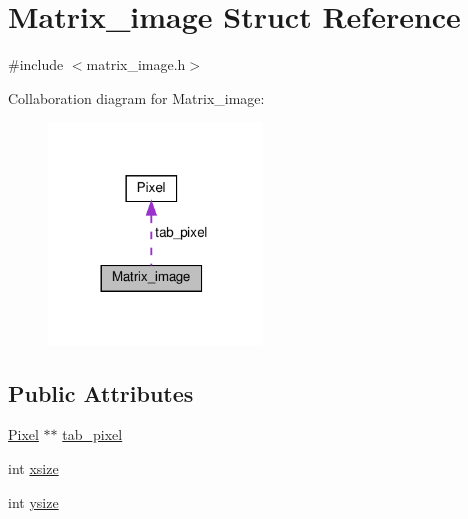 \hypertarget{struct_matrix__image}{}\section{Matrix\+\_\+image Struct Reference}
\label{struct_matrix__image}


{\ttfamily \#include $<$matrix\+\_\+image.\+h$>$}



Collaboration diagram for Matrix\+\_\+image\+:\nopagebreak
\begin{figure}[H]
\begin{center}
\leavevmode
\includegraphics[width=161pt]{struct_matrix__image__coll__graph}
\end{center}
\end{figure}
\subsection*{Public Attributes}
\begin{DoxyCompactItemize}
\item 
\hyperlink{class_pixel}{Pixel} $\ast$$\ast$ \hyperlink{struct_matrix__image_a9276f0a4813f51d635278d661d5d4185}{tab\+\_\+pixel}
\item 
int \hyperlink{struct_matrix__image_ae7d959a24f238fc01c0be5a31b9ee85e}{xsize}
\item 
int \hyperlink{struct_matrix__image_acde4c9c123ca46e60af3d4a0b18d8bfd}{ysize}
\end{DoxyCompactItemize}


